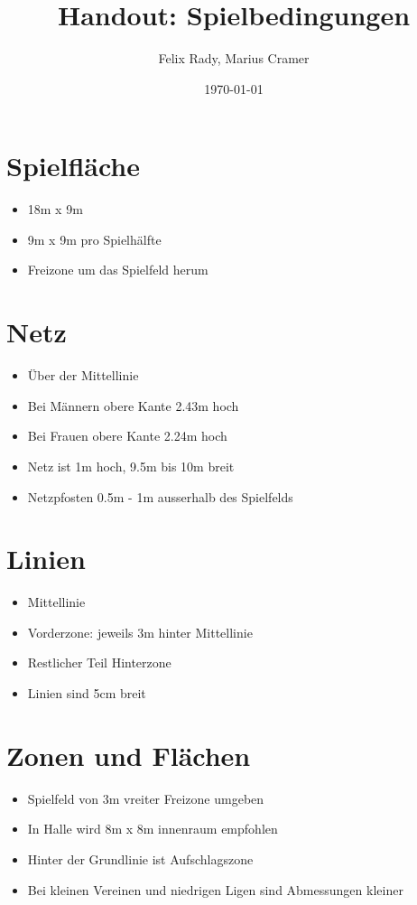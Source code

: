 \documentclass{article}
\title{Handout: Spielbedingungen}
\author{Felix Rady, Marius Cramer}
\date{\today}
\begin{document}
\maketitle

\section{Spielfläche}
\begin{itemize}
  \item 18m x 9m
  \item 9m x 9m pro Spielhälfte
  \item Freizone um das Spielfeld herum
\end{itemize}

\section{Netz}
\begin{itemize}
  \item Über der Mittellinie
  \item Bei Männern obere Kante 2.43m hoch
  \item Bei Frauen obere Kante 2.24m hoch
  \item Netz ist 1m hoch, 9.5m bis 10m breit
  \item Netzpfosten 0.5m - 1m ausserhalb des Spielfelds
\end{itemize}

\section{Linien}
\begin{itemize}
  \item Mittellinie
  \item Vorderzone: jeweils 3m hinter Mittellinie
  \item Restlicher Teil Hinterzone
  \item Linien sind 5cm breit
\end{itemize}

\section{Zonen und Flächen}
\begin{itemize}
  \item Spielfeld von 3m vreiter Freizone umgeben
  \item In Halle wird 8m x 8m innenraum empfohlen
  \item Hinter der Grundlinie ist Aufschlagszone
  \item Bei kleinen Vereinen und niedrigen Ligen sind Abmessungen kleiner
\end{itemize}
\end{document}
